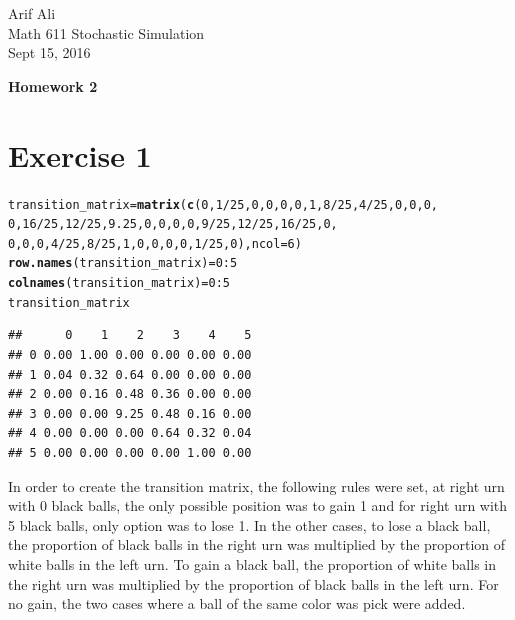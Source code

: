 \documentclass{article}\usepackage[]{graphicx}\usepackage[]{color}
\makeatletter
\newcommand{\hlnum}[1]{\textcolor[rgb]{0.686,0.059,0.569}{#1}}%
\newcommand{\hlopt}[1]{\textcolor[rgb]{0,0,0}{#1}}%
\newcommand{\hlstd}[1]{\textcolor[rgb]{0.345,0.345,0.345}{#1}}%
\newcommand{\hlkwb}[1]{\textcolor[rgb]{0.69,0.353,0.396}{#1}}%
\newcommand{\hlkwc}[1]{\textcolor[rgb]{0.333,0.667,0.333}{#1}}%
\newcommand{\hlkwd}[1]{\textcolor[rgb]{0.737,0.353,0.396}{\textbf{#1}}}%
\newenvironment{kframe}{%
 \def\at@end@of@kframe{}%
 \ifinner\ifhmode%
  \def\at@end@of@kframe{\end{minipage}}%
  \begin{minipage}{\columnwidth}%
 \fi\fi%
 \def\FrameCommand##1{\hskip\@totalleftmargin \hskip-\fboxsep
 \colorbox{shadecolor}{##1}\hskip-\fboxsep
     \hskip-\linewidth \hskip-\@totalleftmargin \hskip\columnwidth}%
 \MakeFramed {\advance\hsize-\width
   \@totalleftmargin\z@ \linewidth\hsize
   \@setminipage}}%
 {\par\unskip\endMakeFramed%
 \at@end@of@kframe}
\newenvironment{knitrout}{}{} %
\makeatother
\begin{document}
\begin{flushright}
Arif Ali\\
Math 611 Stochastic Simulation\\
Sept 15, 2016\\
\end{flushright}

\begin{center}
\LARGE\textbf{Homework 2}
  \end{center}
\section*{Exercise 1}
\begin{knitrout}
\color{fgcolor}\begin{kframe}
\begin{alltt}
\hlstd{transition_matrix} \hlkwb{=} \hlkwd{matrix}\hlstd{(}\hlkwd{c}\hlstd{(}\hlnum{0}\hlstd{,}\hlnum{1}\hlopt{/}\hlnum{25}\hlstd{,}\hlnum{0}\hlstd{,}\hlnum{0}\hlstd{,}\hlnum{0}\hlstd{,}\hlnum{0}\hlstd{,}\hlnum{1}\hlstd{,}\hlnum{8}\hlopt{/}\hlnum{25}\hlstd{,}\hlnum{4}\hlopt{/}\hlnum{25}\hlstd{,}\hlnum{0}\hlstd{,}\hlnum{0}\hlstd{,}\hlnum{0}\hlstd{,}
         \hlnum{0}\hlstd{,}\hlnum{16}\hlopt{/}\hlnum{25}\hlstd{,}\hlnum{12}\hlopt{/}\hlnum{25}\hlstd{,}\hlnum{9.25}\hlstd{,}\hlnum{0}\hlstd{,}\hlnum{0}\hlstd{,} \hlnum{0}\hlstd{,}\hlnum{0}\hlstd{,}\hlnum{9}\hlopt{/}\hlnum{25}\hlstd{,}\hlnum{12}\hlopt{/}\hlnum{25}\hlstd{,}\hlnum{16}\hlopt{/}\hlnum{25}\hlstd{,}\hlnum{0}\hlstd{,}
         \hlnum{0}\hlstd{,}\hlnum{0}\hlstd{,}\hlnum{0}\hlstd{,}\hlnum{4}\hlopt{/}\hlnum{25}\hlstd{,}\hlnum{8}\hlopt{/}\hlnum{25}\hlstd{,}\hlnum{1}\hlstd{,} \hlnum{0}\hlstd{,}\hlnum{0}\hlstd{,}\hlnum{0}\hlstd{,}\hlnum{0}\hlstd{,}\hlnum{1}\hlopt{/}\hlnum{25}\hlstd{,}\hlnum{0}\hlstd{),} \hlkwc{ncol} \hlstd{=} \hlnum{6}\hlstd{)}
\hlkwd{row.names}\hlstd{(transition_matrix)} \hlkwb{=} \hlnum{0}\hlopt{:}\hlnum{5}
\hlkwd{colnames}\hlstd{(transition_matrix)} \hlkwb{=} \hlnum{0}\hlopt{:}\hlnum{5}
\hlstd{transition_matrix}
\end{alltt}
\begin{verbatim}
##      0    1    2    3    4    5
## 0 0.00 1.00 0.00 0.00 0.00 0.00
## 1 0.04 0.32 0.64 0.00 0.00 0.00
## 2 0.00 0.16 0.48 0.36 0.00 0.00
## 3 0.00 0.00 9.25 0.48 0.16 0.00
## 4 0.00 0.00 0.00 0.64 0.32 0.04
## 5 0.00 0.00 0.00 0.00 1.00 0.00
\end{verbatim}
\end{kframe}
\end{knitrout}
In order to create the transition matrix, the following rules were set, at right urn with 0 black balls, the only possible position was to gain 1 and for right urn with 5 black balls, only option was to lose 1. In the other cases, to lose a black ball, the proportion of black balls in the right urn was multiplied by the proportion of white balls in the left urn. To gain a black ball, the proportion of white balls in the right urn was multiplied by the proportion of black balls in the left urn. For no gain, the two cases where a ball of the same color was pick were added.
\end{document}
